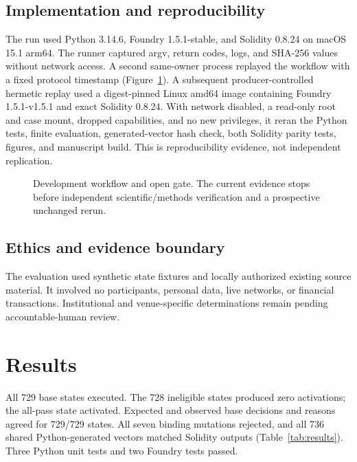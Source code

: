 \documentclass[10pt]{article}
\begin{document}
\subsection{Implementation and reproducibility}

The run used Python 3.14.6, Foundry 1.5.1-stable, and Solidity 0.8.24 on macOS 15.1
arm64. The runner captured argv, return codes, logs, and SHA-256 values without
network access. A second same-owner process replayed the workflow with a fixed
protocol timestamp (Figure~\ref{fig:workflow}). A subsequent producer-controlled
hermetic replay used a digest-pinned Linux amd64 image containing Foundry
1.5.1-v1.5.1 and exact Solidity 0.8.24. With network disabled, a read-only root and
case mount, dropped capabilities, and no new privileges, it reran the Python tests,
finite evaluation, generated-vector hash check, both Solidity parity tests, figures,
and manuscript build. This is reproducibility evidence, not independent replication.

\begin{figure}[t]
\centering
\resizebox{0.72\linewidth}{!}{}
\caption{Development workflow and open gate. The current evidence stops before
independent scientific/methods verification and a prospective unchanged rerun.}
\label{fig:workflow}
\end{figure}

\subsection{Ethics and evidence boundary}

The evaluation used synthetic state fixtures and locally authorized existing source
material. It involved no participants, personal data, live networks, or financial
transactions. Institutional and venue-specific determinations remain pending
accountable-human review.

\section{Results}

All 729 base states executed. The 728 ineligible states produced zero activations;
the all-pass state activated. Expected and observed base decisions and reasons agreed
for 729/729 states. All seven binding mutations rejected, and all 736 shared
Python-generated vectors matched Solidity outputs (Table~\ref{tab:results}). Three
Python unit tests and two Foundry tests passed.
\end{document}
